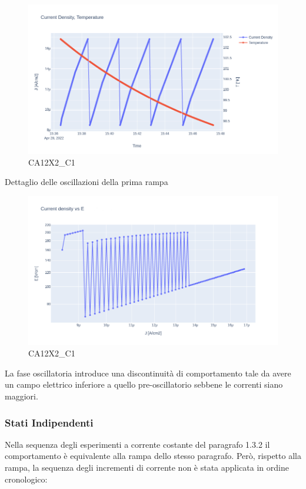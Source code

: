 \documentclass[11pt]{article}
\begin{document}
\begin{figure}
\centering
\includegraphics{CA12X2_C1-j_t.png}
\caption{CA12X2\_C1}
\end{figure}

Dettaglio delle oscillazioni della prima rampa

\begin{figure}
\centering
\includegraphics{CA12X2_C1-e_j.png}
\caption{CA12X2\_C1}
\end{figure}

La fase oscillatoria introduce una discontinuità di comportamento tale
da avere un campo elettrico inferiore a quello pre-oscillatorio sebbene
le correnti siano maggiori.

    \hypertarget{stati-indipendenti}{%
\subsubsection{Stati Indipendenti}\label{stati-indipendenti}}

Nella sequenza degli esperimenti a corrente costante del paragrafo 1.3.2
il comportamento è equivalente alla rampa dello stesso paragrafo. Però,
rispetto alla rampa, la sequenza degli incrementi di corrente non è
stata applicata in ordine cronologico:
\end{document}
